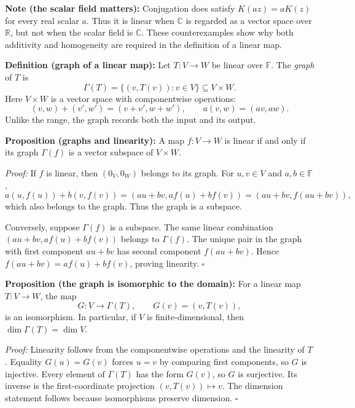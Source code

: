 \documentclass[a4paper,11pt,abstract=true]{scrartcl}
\theoremstyle{dotlessP}
\theoremstyle{dotlessS}
\theoremstyle{remark}
\theoremstyle{definition}
\begin{document}
\begin{remark_box}
\textbf{Note (the scalar field matters):} Conjugation does satisfy
$K(az)=aK(z)$ for every real scalar $a$. Thus it is linear when
$\mathbb{C}$ is regarded as a vector space over $\mathbb{R}$, but not when
the scalar field is $\mathbb{C}$. These counterexamples show why both
additivity and homogeneity are required in the definition of a linear map.
\end{remark_box}

\begin{claim_box}
\textbf{Definition (graph of a linear map):} Let
$T:V\longrightarrow W$ be linear over $\mathbb{F}$. The \emph{graph}
of $T$ is
\[
\Gamma(T)=\{(v,T(v)):v\in V\}\subseteq V\times W.
\]
Here $V\times W$ is a vector space with componentwise operations:
\[
(v,w)+(v',w')=(v+v',w+w'),\qquad a(v,w)=(av,aw).
\]
Unlike the range, the graph records both the input and its output.
\end{claim_box}

\begin{claim_box}
\textbf{Proposition (graphs and linearity):} A map
$f:V\longrightarrow W$ is linear if and only if its graph
$\Gamma(f)$ is a vector subspace of $V\times W$.

\textit{Proof:} If $f$ is linear, then $(0_V,0_W)$ belongs to its
graph. For $u,v\in V$ and $a,b\in\mathbb{F}$,
\[
a(u,f(u))+b(v,f(v))=(au+bv,af(u)+bf(v))
=(au+bv,f(au+bv)),
\]
which also belongs to the graph. Thus the graph is a subspace.

Conversely, suppose $\Gamma(f)$ is a subspace. The same linear
combination $(au+bv,af(u)+bf(v))$ belongs to $\Gamma(f)$.
The unique pair in the graph with first component $au+bv$ has second
component $f(au+bv)$. Hence
$f(au+bv)=af(u)+bf(v)$, proving linearity. \hfill$\square$
\end{claim_box}

\begin{claim_box}
\textbf{Proposition (the graph is isomorphic to the domain):}
For a linear map $T:V\longrightarrow W$, the map
\[
G:V\longrightarrow\Gamma(T),\qquad G(v)=(v,T(v)),
\]
is an isomorphism. In particular, if $V$ is finite-dimensional, then
$\dim\Gamma(T)=\dim V$.

\textit{Proof:} Linearity follows from the componentwise operations
and the linearity of $T$. Equality $G(u)=G(v)$ forces $u=v$ by
comparing first components, so $G$ is injective. Every element of
$\Gamma(T)$ has the form $G(v)$, so $G$ is surjective. Its inverse
is the first-coordinate projection $(v,T(v))\mapsto v$.
The dimension statement follows because isomorphisms preserve
dimension. \hfill$\square$
\end{claim_box}
\end{document}
